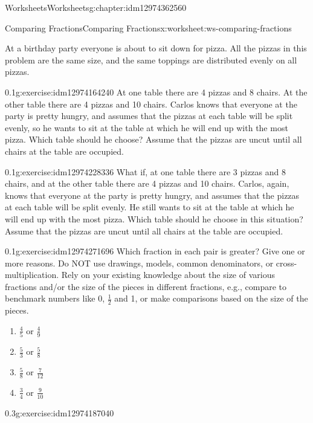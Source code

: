 \documentclass[twoside,11pt,]{book}
\begin{document}
\begin{chapterptx}{Worksheets}{}{Worksheets}{}{}{g:chapter:idm12974362560}
\begin{worksheet-section-numberless}{Comparing Fractions}{}{Comparing Fractions}{}{}{x:worksheet:ws-comparing-fractions}
\begin{introduction}{}%
At a birthday party everyone is about to sit down for pizza.  All the pizzas in this problem are the same size, and the same toppings are distributed evenly on all pizzas.%
\end{introduction}%
\begin{divisionexercise}{1}{}{0.1}{g:exercise:idm12974164240}%
At one table there are 4 pizzas and 8 chairs.  At the other table there are 4 pizzas and 10 chairs.  Carlos knows that everyone at the party is pretty hungry, and assumes that the pizzas at each table will be split evenly, so he wants to sit at the table at which he will end up with the most pizza.  Which table should he choose?  Assume that the pizzas are uncut until all chairs at the table are occupied.%
\end{divisionexercise}%
\begin{divisionexercise}{2}{}{0.1}{g:exercise:idm12974228336}%
What if, at one table there are 3 pizzas and 8 chairs, and at the other table there are 4 pizzas and 10 chairs.  Carlos, again, knows that everyone at the party is pretty hungry, and assumes that the pizzas at each table will be split evenly.  He still wants to sit at the table at which he will end up with the most pizza.  Which table should he choose in this situation? Assume that the pizzas are uncut until all chairs at the table are occupied.%
\end{divisionexercise}%
\begin{divisionexercise}{3}{}{0.1}{g:exercise:idm12974271696}%
Which fraction in each pair is greater?  Give one or more reasons.  Do NOT use drawings, models, common denominators, or cross-multiplication.  Rely on your existing knowledge about the size of various fractions and\slash{}or the size of the pieces in different fractions, e.g., compare to benchmark numbers like 0, \(\frac{1}{2} \) and 1, or make comparisons based on the size of the pieces.%
%
\begin{enumerate}[label=(\alph*)]
\item{}\(\frac{4}{5} \) or \(\frac{4}{9} \)%
\item{}\(\frac{5}{3} \) or \(\frac{5}{8} \)%
\item{}\(\frac{5}{8} \) or \(\frac{7}{12} \)%
\item{}\(\frac{3}{4} \) or \(\frac{9}{10} \)%
\end{enumerate}
\end{divisionexercise}%
\clearpage
\begin{divisionexercise}{4}{}{0.3}{g:exercise:idm12974187040}%

\end{divisionexercise}
\end{worksheet-section-numberless}
\end{chapterptx}
\end{document}
